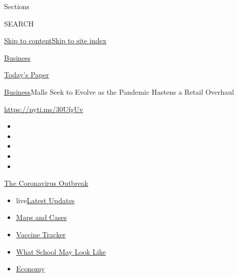 Sections

SEARCH

\protect\hyperlink{site-content}{Skip to
content}\protect\hyperlink{site-index}{Skip to site index}

\href{https://www.nytimes.com/section/business}{Business}

\href{https://myaccount.nytimes.com/auth/login?response_type=cookie\&client_id=vi}{}

\href{https://www.nytimes.com/section/todayspaper}{Today's Paper}

\href{/section/business}{Business}\textbar{}Malls Seek to Evolve as the
Pandemic Hastens a Retail Overhaul

\url{https://nyti.ms/30UfgUv}

\begin{itemize}
\item
\item
\item
\item
\item
\end{itemize}

\href{https://www.nytimes.com/news-event/coronavirus?action=click\&pgtype=Article\&state=default\&region=TOP_BANNER\&context=storylines_menu}{The
Coronavirus Outbreak}

\begin{itemize}
\tightlist
\item
  live\href{https://www.nytimes.com/2020/08/01/world/coronavirus-covid-19.html?action=click\&pgtype=Article\&state=default\&region=TOP_BANNER\&context=storylines_menu}{Latest
  Updates}
\item
  \href{https://www.nytimes.com/interactive/2020/us/coronavirus-us-cases.html?action=click\&pgtype=Article\&state=default\&region=TOP_BANNER\&context=storylines_menu}{Maps
  and Cases}
\item
  \href{https://www.nytimes.com/interactive/2020/science/coronavirus-vaccine-tracker.html?action=click\&pgtype=Article\&state=default\&region=TOP_BANNER\&context=storylines_menu}{Vaccine
  Tracker}
\item
  \href{https://www.nytimes.com/interactive/2020/07/29/us/schools-reopening-coronavirus.html?action=click\&pgtype=Article\&state=default\&region=TOP_BANNER\&context=storylines_menu}{What
  School May Look Like}
\item
  \href{https://www.nytimes.com/live/2020/07/31/business/stock-market-today-coronavirus?action=click\&pgtype=Article\&state=default\&region=TOP_BANNER\&context=storylines_menu}{Economy}
\end{itemize}

